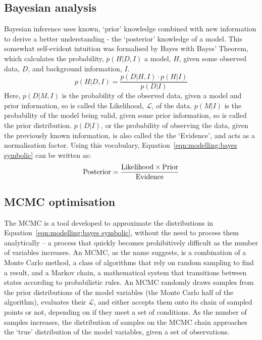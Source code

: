 \subsection{Bayesian analysis}
Bayesian inference uses known, `prior' knowledge combined with new information to derive a better understanding - the `posterior' knowledge of a model. This somewhat self-evident intuition was formalised by Bayes with Bayes' Theorem, which calculates the probability, $p(H | D, I)$ a model, $H$, given some observed data, $D$, and background information, $I$. 
\begin{equation}
    \label{eqn:modelling:bayes symbolic}
    p(H | D,I) = \frac{p(D | H, I) \cdot p(H | I)}{p(D|I)}
\end{equation}
Here, $p(D | M, I)$ is the probability of the observed data, given a model and prior information, so is called the Likelihood, $\mathcal{L}$, of the data. 
$p(M|I)$ is the probability of the model being valid, given some prior information, so is called the prior distribution. $p(D | I)$, or the probability of observing the data, given the previously known information, is also called the the `Evidence', and acts as a normalisation factor. Using this vocabulary, Equation~\ref{eqn:modelling:bayes symbolic} can be written as:
\begin{equation}
    \label{eqn:modelling:bayes english}
    \rm Posterior = \frac{Likelihood \times Prior}{Evidence}
\end{equation}

\subsection{MCMC optimisation}
The MCMC is a tool developed to approximate the distributions in Equation~\ref{eqn:modelling:bayes symbolic}, without the need to process them analytically -- a process that quickly becomes prohibitively difficult as the number of variables increases. 
An MCMC, as the name suggests, is a combination of a Monte Carlo method, a class of algorithms that rely on random sampling to find a result, and a Markov chain, a mathematical system that transitions between states according to probabilistic rules. An MCMC randomly draws samples from the prior distributions of the model variables (the Monte Carlo half of the algorithm), evaluates their $\mathcal{L}$, and either accepts them onto its chain of sampled points or not, depending on if they meet a set of conditions. As the number of samples increases, the distribution of samples on the MCMC chain approaches the `true' distribution of the model variables, given a set of observations. 


